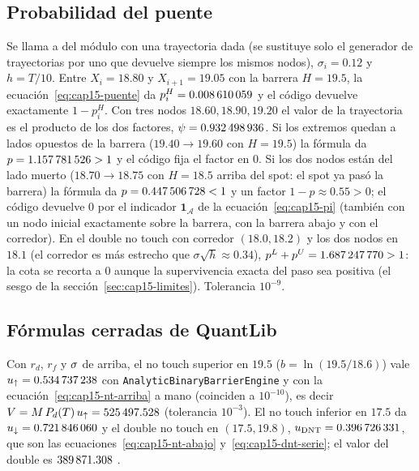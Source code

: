 \subsection{Probabilidad del puente}\label{sec:cap15-ej-puente}

Se llama a  del módulo con una trayectoria dada (se sustituye solo el generador de trayectorias por uno que
devuelve siempre los mismos nodos), $\sigma_i=0.12$ y $h=T/10$. Entre $X_i=18.80$ y $X_{i+1}=19.05$ con la barrera $H=19.5$, la
ecuación~\eqref{eq:cap15-puente} da $p_i^{H}=\verif{cap15-puente-p1}{0.008610059}$ y el código devuelve exactamente $1-p_i^{H}$. Con tres nodos
$18.60,18.90,19.20$ el valor de la trayectoria es el producto de los dos factores,
$\psi=\verif{cap15-puente-prod3}{0.932498936}$. Si los extremos quedan a lados opuestos de la barrera ($19.40\to19.60$ con $H=19.5$) la fórmula
da $p=\verif{cap15-puente-p-cruzado}{1.157781526}>1$ y el código fija el factor en $0$. Si los dos nodos están del lado muerto ($18.70\to18.75$ con $H=18.5$ arriba del spot: el spot ya pasó
la barrera) la fórmula da $p=\verif{cap15-puente-p-muerto}{0.447506728}<1$ y un factor $1-p\approx0.55>0$; el código devuelve $0$ por el indicador $\mathbf 1_{\mathcal A}$
de la ecuación~\eqref{eq:cap15-pi} (también con un nodo inicial exactamente sobre la barrera, con la barrera abajo y con el corredor). En el double no touch con corredor $(18.0,18.2)$ y los dos
nodos en $18.1$ (el corredor es más estrecho que $\sigma\sqrt h\approx0.34$), $p^{L}+p^{U}=\verif{cap15-puente-suma-doble}{1.687247770}>1$: la cota se recorta a $0$ aunque
la supervivencia exacta del paso sea positiva (el sesgo de la sección~\ref{sec:cap15-limites}). Tolerancia $10^{-9}$.

\subsection{Fórmulas cerradas de QuantLib}\label{sec:cap15-ej-cerradas}

Con $r_d$, $r_f$ y $\vol$ de arriba, el no touch superior en $19.5$ ($b=\ln(19.5/18.6)$) vale
$u_{\uparrow}=\verif{cap15-nt-u-an}{0.534737238}$ con \texttt{AnalyticBinaryBarrierEngine} y con la ecuación~\eqref{eq:cap15-nt-arriba} a mano (coinciden a $10^{-10}$),
es decir $\PV=M\,\DF{d}{T}\,u_{\uparrow}=\verif{cap15-nt-pv-an}{525497.528}$ \MXN{} (tolerancia $10^{-3}$). El no touch inferior en $17.5$ da
$u_{\downarrow}=\verif{cap15-ntabajo-u-an}{0.721846060}$ y el double no touch en $(17.5,19.8)$, $u_{\mathrm{DNT}}=\verif{cap15-dnt-u-an}{0.396726331}$, que son
las ecuaciones~\eqref{eq:cap15-nt-abajo} y~\eqref{eq:cap15-dnt-serie}; el valor del double es $\verif{cap15-dnt-pv-an}{389871.308}$ \MXN{}.

